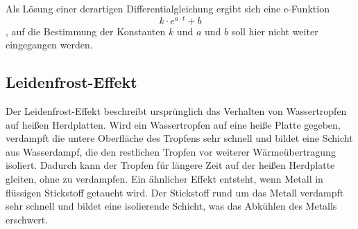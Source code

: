 Als Lösung einer derartigen Differentialgleichung ergibt sich eine e-Funktion 
\begin{equation}
k \cdot e^{a \cdot t} + b
\label{form:konvektion2}
\end{equation}
, auf die Bestimmung der Konstanten $k$ und $a$ und $b$ soll hier nicht weiter eingegangen werden. 

\subsection{Leidenfrost-Effekt}
Der Leidenfrost-Effekt beschreibt ursprünglich das Verhalten von Wassertropfen auf heißen Herdplatten. Wird ein Wassertropfen auf eine heiße Platte gegeben, verdampft die untere Oberfläche des Tropfens sehr schnell und bildet eine Schicht aus Wasserdampf, die den restlichen Tropfen vor weiterer Wärmeübertragung isoliert. Dadurch kann der Tropfen für längere Zeit auf der heißen Herdplatte gleiten, ohne zu verdampfen.
Ein ähnlicher Effekt entsteht, wenn Metall in flüssigen Stickstoff getaucht wird. Der Stickstoff rund um das Metall verdampft sehr schnell und bildet eine isolierende Schicht, was das Abkühlen des Metalls erschwert.
